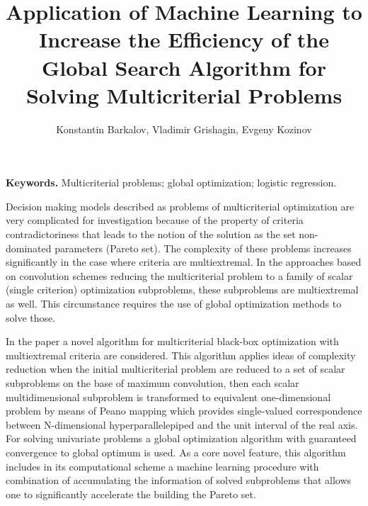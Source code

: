 \documentclass[oribibl]{llncs}
\begin{document}
\cleardoublepage

\title{Application of Machine Learning to Increase the Efficiency of the Global Search Algorithm for Solving Multicriterial Problems}
\author{Konstantin Barkalov, Vladimir Grishagin, Evgeny Kozinov}



\maketitle

\thispagestyle{fancy}

\textbf{Keywords.} Multicriterial problems; global optimization; logistic regression. %

 \vspace*{0.5cm}


Decision making models described as problems of multicriterial optimization are very complicated for investigation because of the property of criteria contradictoriness that leads to the notion of the solution as the set non-dominated parameters (Pareto set). The complexity of these problems increases significantly in the case where criteria are multiextremal. In the approaches based on convolution schemes reducing the multicriterial problem to a family of scalar (single criterion) optimization subproblems, these subproblems are multiextremal as well. This circumstance requires the use of global optimization methods to solve those.

In the paper a novel algorithm for multicriterial black-box optimization with multiextremal criteria are considered. This algorithm applies ideas of complexity reduction when the initial multicriterial problem are reduced to a set of scalar subproblems on the base of maximum convolution, then each scalar multidimensional subproblem is transformed to equivalent one-dimensional problem by means of Peano mapping which provides single-valued correspondence between N-dimensional hyperparallelepiped and the unit interval of the real axis. For solving univariate problems a global optimization algorithm with guaranteed convergence to global optimum is used. As a core novel feature, this algorithm includes in its computational scheme a machine learning procedure with combination of accumulating the information of solved subproblems that allows one to significantly accelerate the building the Pareto set.
\end{document}
